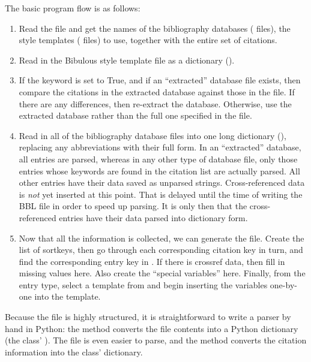 \documentclass[letterpaper,10pt,english]{sphinxmanual}
\begin{document}
The basic program flow is as follows:
\begin{enumerate}
\item {} 
Read the  file and get the names of the bibliography databases ( files), the style templates ( files) to use, together with the entire set of citations.

\item {} 
Read in the Bibulous style template file as a dictionary ().

\item {} 
If the  keyword is set to True, and if an ``extracted'' database file exists, then compare the citations in the extracted database against those in the  file. If there are any differences, then re-extract the database. Otherwise, use the extracted database rather than the full one specified in the  file.

\item {} 
Read in all of the bibliography database files into one long dictionary (), replacing any abbreviations with their full form. In an ``extracted'' database, all entries are parsed, whereas in any other type of database file, only those entries whose keywords are found in the citation list are actually parsed. All other entries have their data saved as unparsed strings. Cross-referenced data is \emph{not} yet inserted at this point. That is delayed until the time of writing the BBL file in order to speed up parsing. It is only then that the cross-referenced entries have their data parsed into dictionary form.

\item {} 
Now that all the information is collected, we can generate the  file. Create the list of sortkeys, then go through each corresponding citation key in turn, and find the corresponding entry key in . If there is crossref data, then fill in missing values here. Also create the ``special variables'' here. Finally, from the entry type, select a template from  and begin inserting the variables one-by-one into the template.

\end{enumerate}

Because the  file is highly structured, it is straightforward to write a parser by hand in Python: the  method converts the  file contents into a Python dictionary (the  class' ). The  file is even easier to parse, and the  method converts the citation information into the  class'  dictionary.
\end{document}
